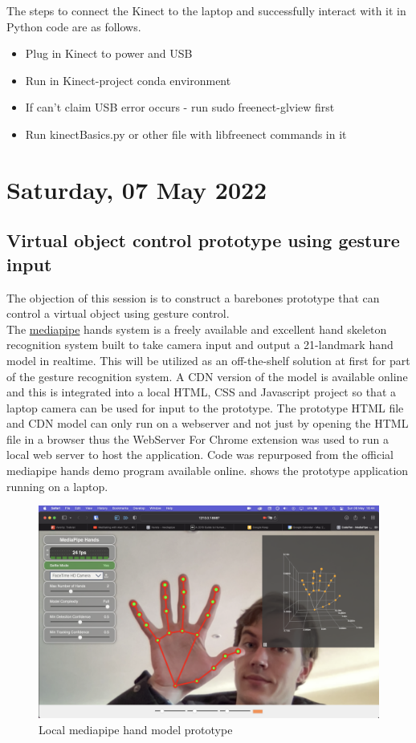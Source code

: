 The steps to connect the Kinect to the laptop and successfully interact with it in Python code are as follows.

\begin{itemize}
    \item Plug in Kinect to power and USB
    \item Run in Kinect-project conda environment
    \item If can't claim USB error occurs - run sudo freenect-glview first
    \item Run kinectBasics.py or other file with libfreenect commands in it
\end{itemize}

\section[2022/05/07]{Saturday, 07 May 2022}

\subsection{Virtual object control prototype using gesture input}

The objection of this session is to construct a barebones prototype that can control a virtual object using gesture control. \\

The \href{https://mediapipe.dev}{mediapipe} hands system is a freely available and excellent hand skeleton recognition system built to take camera input and output a 21-landmark hand model in realtime. This will be utilized as an off-the-shelf solution at first for part of the gesture recognition system. A CDN version of the model is available online and this is integrated into a local HTML, CSS and Javascript project so that a laptop camera can be used for input to the prototype. The prototype HTML file and CDN model can only run on a webserver and not just by opening the HTML file in a browser thus the WebServer For Chrome extension was used to run a local web server to host the application. Code was repurposed from the official mediapipe hands demo program available online.  shows the prototype application running on a laptop. 

\begin{figure}[h]
    \centering
    \includegraphics[width=0.7\linewidth]{figures/mediapipe_app.png}
    \caption{Local mediapipe hand model prototype}
    \label{fig:mediapipe_app}
\end{figure}

